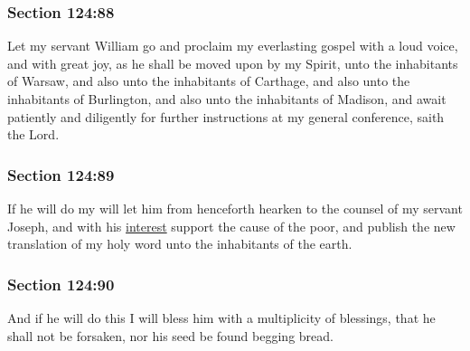 	\subsubsection{Section 124:88} %
		\label{DC124-88}

		Let my servant William go and proclaim my everlasting gospel with a loud voice, and with great joy, as he shall be moved upon by my Spirit, unto the inhabitants of Warsaw, and also unto the inhabitants of Carthage, and also unto the inhabitants of Burlington, and also unto the inhabitants of Madison, and await patiently and diligently for further instructions at my general conference, saith the Lord.


	\subsubsection{Section 124:89} %
		\label{DC124-89}

		If he will do my will let him from henceforth hearken to the counsel of my servant Joseph, and with his \hyperref[INTEREST]{interest} support the cause of the poor, and publish the new translation of my holy word unto the inhabitants of the earth.


	\subsubsection{Section 124:90} %
		\label{DC124-90}

		And if he will do this I will bless him with a multiplicity of blessings, that he shall not be forsaken, nor his seed be found begging bread.

